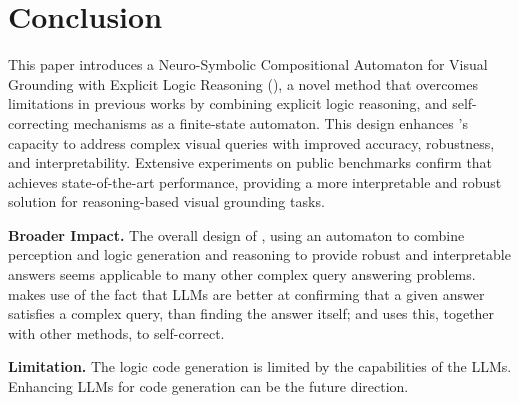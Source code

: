 \section{Conclusion}
This paper introduces a Neuro-Symbolic Compositional Automaton for Visual Grounding with Explicit Logic Reasoning (\methodname{}), a novel method that overcomes limitations in previous works by combining explicit logic reasoning, and self-correcting mechanisms as a finite-state automaton. This design enhances \methodname{}’s capacity to address complex visual queries with improved accuracy, robustness, and interpretability. Extensive experiments on public benchmarks confirm that \methodname{} achieves state-of-the-art performance, providing a more interpretable and robust solution for reasoning-based visual grounding tasks.

\noindent\textbf{Broader Impact.} The overall design of \methodname{}, using an automaton to combine perception and logic generation and reasoning to provide robust and interpretable answers seems applicable to many other complex query answering problems. \methodname{} makes use of the fact that LLMs are better at confirming that a given answer satisfies a complex query, than finding the answer itself; and uses this, together with other methods, to self-correct. 

\noindent\textbf{Limitation.} The logic code generation is limited by the capabilities of the LLMs. Enhancing LLMs for code generation can be the future direction.
